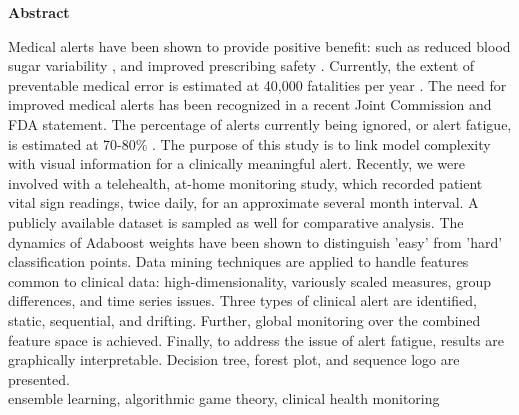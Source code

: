 \documentclass[12pt]{article}
\begin{document}
\begin{center}
    {\bf Abstract}\\
\end{center}
\noindent
Medical alerts have been shown to provide positive benefit: such as reduced blood sugar variability \cite{Mastro}, and improved prescribing safety \cite{Raebel}.  Currently, the extent of preventable medical error is estimated at 40,000 fatalities per year \cite{Muse}.  The need for improved medical alerts has been recognized in a recent Joint Commission and FDA statement.  The percentage of alerts currently being ignored, or alert fatigue, is estimated at 70-80\% \cite{Gouveia}.  The purpose of this study is to link model complexity with visual information for a clinically meaningful alert.  Recently, we were involved with a telehealth, at-home monitoring study, which recorded patient vital sign readings, twice daily, for an approximate several month interval.  A publicly available dataset is sampled as well for comparative analysis.  The dynamics of Adaboost weights have been shown to distinguish 'easy' from 'hard' classification points\cite{Capri2002}.  Data mining techniques are applied to handle features common to clinical data: high-dimensionality, variously scaled measures, group differences, and time series issues.  Three types of clinical alert are identified, static, sequential, and drifting.  Further, global monitoring over the combined feature space is achieved.  Finally, to address the issue of alert fatigue, results are graphically interpretable.  Decision tree, forest plot, and sequence logo are presented.
\\
 ensemble learning, algorithmic game theory, clinical health monitoring
\end{document}
